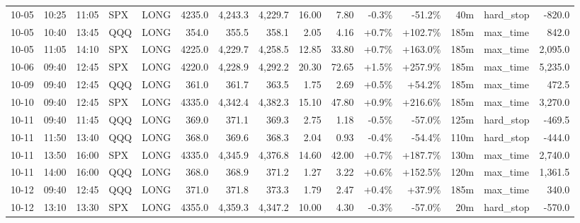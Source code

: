 \documentclass[11pt,a4paper,twoside]{article}
\begin{document}
\begin{landscape}
\begin{center}
\begin{longtable}{>{\color{txtmain}}l l l l l r r r r r r r r >{\color{txtmain}}l r}
10-05 & 10:25 & 11:05 & SPX & LONG & 4235.0 & 4,243.3 & 4,229.7 & 16.00 & 7.80 & \textcolor{lossred}{-0.3\%} & \textcolor{lossred}{-51.2\%} & 40m & hard\_stop & \textcolor{lossred}{-820.0} \\
10-05 & 10:40 & 13:45 & QQQ & LONG & 354.0 & 355.5 & 358.1 & 2.05 & 4.16 & \textcolor{wingreen}{+0.7\%} & \textcolor{wingreen}{+102.7\%} & 185m & max\_time & \textcolor{wingreen}{842.0} \\
10-05 & 11:05 & 14:10 & SPX & LONG & 4225.0 & 4,229.7 & 4,258.5 & 12.85 & 33.80 & \textcolor{wingreen}{+0.7\%} & \textcolor{wingreen}{+163.0\%} & 185m & max\_time & \textcolor{wingreen}{2,095.0} \\
10-06 & 09:40 & 12:45 & SPX & LONG & 4220.0 & 4,228.9 & 4,292.2 & 20.30 & 72.65 & \textcolor{wingreen}{+1.5\%} & \textcolor{wingreen}{+257.9\%} & 185m & max\_time & \textcolor{wingreen}{5,235.0} \\
10-09 & 09:40 & 12:45 & QQQ & LONG & 361.0 & 361.7 & 363.5 & 1.75 & 2.69 & \textcolor{wingreen}{+0.5\%} & \textcolor{wingreen}{+54.2\%} & 185m & max\_time & \textcolor{wingreen}{472.5} \\
10-10 & 09:40 & 12:45 & SPX & LONG & 4335.0 & 4,342.4 & 4,382.3 & 15.10 & 47.80 & \textcolor{wingreen}{+0.9\%} & \textcolor{wingreen}{+216.6\%} & 185m & max\_time & \textcolor{wingreen}{3,270.0} \\
10-11 & 09:40 & 11:45 & QQQ & LONG & 369.0 & 371.1 & 369.3 & 2.75 & 1.18 & \textcolor{lossred}{-0.5\%} & \textcolor{lossred}{-57.0\%} & 125m & hard\_stop & \textcolor{lossred}{-469.5} \\
10-11 & 11:50 & 13:40 & QQQ & LONG & 368.0 & 369.6 & 368.3 & 2.04 & 0.93 & \textcolor{lossred}{-0.4\%} & \textcolor{lossred}{-54.4\%} & 110m & hard\_stop & \textcolor{lossred}{-444.0} \\
10-11 & 13:50 & 16:00 & SPX & LONG & 4335.0 & 4,345.9 & 4,376.8 & 14.60 & 42.00 & \textcolor{wingreen}{+0.7\%} & \textcolor{wingreen}{+187.7\%} & 130m & max\_time & \textcolor{wingreen}{2,740.0} \\
10-11 & 14:00 & 16:00 & QQQ & LONG & 368.0 & 368.9 & 371.2 & 1.27 & 3.22 & \textcolor{wingreen}{+0.6\%} & \textcolor{wingreen}{+152.5\%} & 120m & max\_time & \textcolor{wingreen}{1,361.5} \\
10-12 & 09:40 & 12:45 & QQQ & LONG & 371.0 & 371.8 & 373.3 & 1.79 & 2.47 & \textcolor{wingreen}{+0.4\%} & \textcolor{wingreen}{+37.9\%} & 185m & max\_time & \textcolor{wingreen}{340.0} \\
10-12 & 13:10 & 13:30 & SPX & LONG & 4355.0 & 4,359.3 & 4,347.2 & 10.00 & 4.30 & \textcolor{lossred}{-0.3\%} & \textcolor{lossred}{-57.0\%} & 20m & hard\_stop & \textcolor{lossred}{-570.0} \\

\end{longtable}
\end{center}
\end{landscape}
\end{document}

